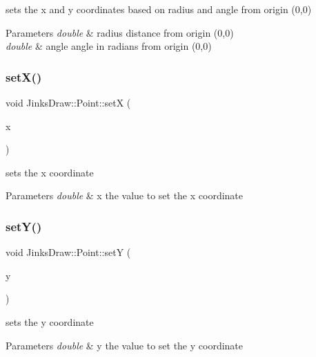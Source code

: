 sets the x and y coordinates based on radius and angle from origin (0,0) 


\begin{DoxyParams}{Parameters}
{\em double} & radius distance from origin (0,0) \\
\hline
{\em double} & angle angle in radians from origin (0,0) \\
\hline
\end{DoxyParams}
\mbox{\label{class_jinks_draw_1_1_point_a88c728619ffd56b0a05e73aa12a749e1}} 
\subsubsection{\texorpdfstring{set\+X()}{setX()}}
{\footnotesize\ttfamily void Jinks\+Draw\+::\+Point\+::setX (\begin{DoxyParamCaption}\item[{double}]{x }\end{DoxyParamCaption})}



sets the x coordinate 


\begin{DoxyParams}{Parameters}
{\em double} & x the value to set the x coordinate \\
\hline
\end{DoxyParams}
\mbox{\label{class_jinks_draw_1_1_point_a828cbcb4a21065420758e422265dc35f}} 
\subsubsection{\texorpdfstring{set\+Y()}{setY()}}
{\footnotesize\ttfamily void Jinks\+Draw\+::\+Point\+::setY (\begin{DoxyParamCaption}\item[{double}]{y }\end{DoxyParamCaption})}



sets the y coordinate 


\begin{DoxyParams}{Parameters}
{\em double} & y the value to set the y coordinate \\
\hline
\end{DoxyParams}


